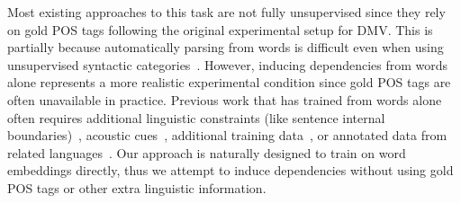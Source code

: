 \documentclass[11pt,a4paper]{article}
\begin{document}
Most existing approaches to this task are not fully unsupervised since they rely on gold POS tags following the original experimental setup for DMV. This is partially because automatically parsing from words is difficult even when using unsupervised syntactic categories~\citep{spitkovsky2011unsupervised}. However, inducing dependencies from words alone represents a more realistic experimental condition since gold POS tags are often unavailable in practice. Previous work that has trained from words alone often requires additional linguistic constraints (like sentence internal boundaries)~\citep{spitkovsky2011unsupervised, spitkovsky2011punctuation, spitkovsky2012capitalization, spitkovsky2013breaking}, acoustic cues~\citep{pate2013unsupervised}, additional training data~\citep{pate2016grammar}, or annotated data from related languages~\citep{cohen2011unsupervised}. Our approach is naturally designed to train on word embeddings directly, thus we attempt to induce dependencies without using gold POS tags or other extra linguistic information.
\end{document}
